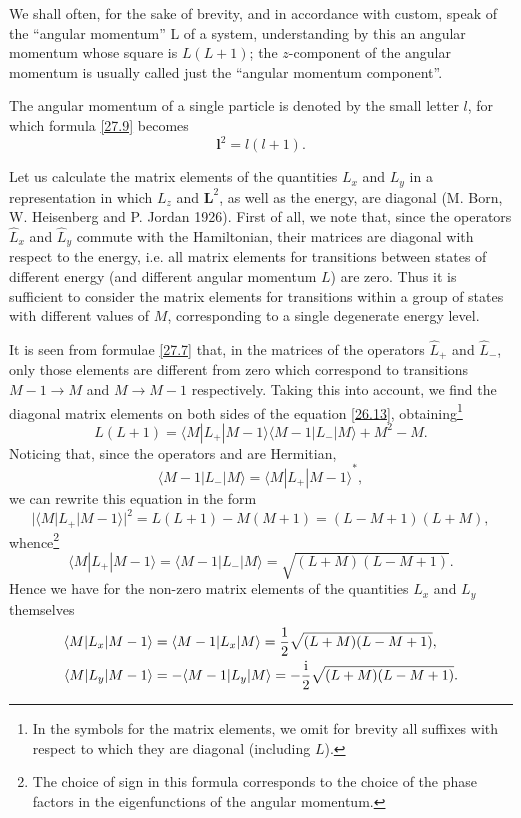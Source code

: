 We shall often, for the sake of brevity, and in accordance with custom, speak of the “angular momentum” L of a system, understanding by this an angular momentum whose square is $ L (L + 1) $; the $ z $-component of the angular momentum is usually called just the “angular momentum component”.

The angular momentum of a single particle is denoted by the small letter $ l $, for which formula \eqref{27.9} becomes
\begin{equation}\label{27.11}
\bm{l}^2=l(l+1).
\end{equation}



Let us calculate the matrix elements of the quantities $ L_x $ and $ L_y $ in a representation in which $ L_z $ and $ \bm{L}^2 $, as well as the energy, are diagonal (M. Born, W. Heisenberg and P. Jordan 1926). First of all, we note that, since the operators $\hat{L}_x$ and $ \hat{L}_y $ commute with the Hamiltonian, their matrices are diagonal with respect to the energy, i.e. all matrix elements for transitions between states of different energy (and different angular momentum $ L $) are zero. Thus it is sufficient to consider the matrix elements for transitions within a group of states with different values of $ M $, corresponding to a single degenerate energy level.

It is seen from formulae \eqref{27.7} that, in the matrices of the operators $ \hat{L}_+ $ and $ \hat{L}_- $, only those elements are different from zero which correspond to transitions $ M - 1 \to M $ and $ M \to M - 1 $ respectively. Taking this into account, we find the diagonal matrix elements on both sides of the equation \eqref{26.13}, obtaining\footnote{In the symbols for the matrix elements, we omit for brevity all suffixes with respect to which they are diagonal (including $ L $).}
\[ L(L+1)=\langle M|L_+|M-1\rangle\langle M-1|L_-|M\rangle+M^2-M. \]
Noticing that, since the operators and are Hermitian,
\[\langle M-1|L_-|M\rangle={\langle M|L_+|M-1\rangle}^*  ,\]
we can rewrite this equation in the form
\[ |\langle M|L_+|M-1\rangle|^2=L(L+1)-M(M+1)=(L-M+1)(L+M), \]
whence\footnote{The choice of sign in this formula corresponds to the choice of the phase factors in the eigenfunctions of the angular momentum.
}
\begin{equation}\label{27.12}
\langle M|L_+|M-1\rangle=\langle M-1|L_-|M\rangle=\sqrt{(L+M)(L-M+1)}.
\end{equation}
Hence we have for the non-zero matrix elements of the quantities $ L_x $ and $ L_y $ themselves
\begin{equation}\label{27.13}
\begin{split}
\langle M|L_x|M-1\rangle&=\langle M-1|L_x|M\rangle=\frac{1}{2}\sqrt{(L+M)(L-M+1)},\\
\langle M|L_y|M-1\rangle&=-\langle M-1|L_y|M\rangle=-\frac{\mathrm{i}}{2}\sqrt{(L+M)(L-M+1)}.
\end{split}
\end{equation}


